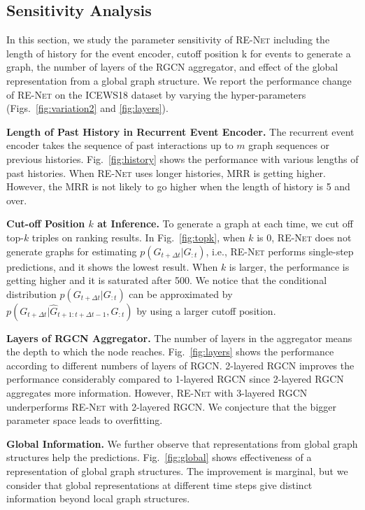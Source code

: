\documentclass[11pt,a4paper]{article}
\newcommand{\prob}{p}
\newcommand{\method}{\textsc{RE-Net}\xspace}
\newcommand{\para}[1]{\smallskip\noindent\textbf{#1}}
\begin{document}
\subsection{Sensitivity Analysis}
\label{sec:sens}
In this section, we study the parameter sensitivity of \method including the length of history for the event encoder, cutoff position k for events to generate a graph, the number of layers of the RGCN aggregator, and effect of the global representation from a global graph structure.
We report the performance change of \method on the ICEWS18 dataset by varying the hyper-parameters (Figs.~\ref{fig:variation2} and \ref{fig:layers}).


\para{Length of Past History in Recurrent Event Encoder.}
The recurrent event encoder takes the sequence of past interactions up to $m$ graph sequences or previous histories. 
Fig.~\ref{fig:history} shows the performance with various lengths of past histories.
When \method uses longer histories, MRR is getting higher.
However, the MRR is not likely to go higher when the length of history is 5 and over.

\para{Cut-off Position $k$ at Inference.} 
To generate a graph at each time, we cut off top-$k$ triples on ranking results.
In Fig.~\ref{fig:topk},
when $k$ is 0, \method does not generate graphs for estimating $\prob(G_{t+\Delta t}|G_{:t})$, i.e., \method performs single-step predictions, and it shows the lowest result.
When $k$ is larger, the performance is getting higher and it is saturated after 500.
We notice that the conditional distribution $\prob(G_{t+\Delta t}|G_{:t})$ can be approximated by $\prob(G_{t+\Delta t}|\allowbreak \hat{G}_{t+1:t+\Delta t -1},G_{:t})$ by using a larger cutoff position.


\para{Layers of RGCN Aggregator.}
The number of layers in the aggregator means the depth to which the node reaches.
Fig.~\ref{fig:layers} shows the performance according to different numbers of layers of RGCN.
2-layered RGCN improves the performance considerably compared to 1-layered RGCN since 2-layered RGCN aggregates more information.
However, \method with 3-layered RGCN underperforms \method with 2-layered RGCN. 
We conjecture that the bigger parameter space leads to overfitting.


\para{Global Information.}
We further observe that representations from global graph structures help the predictions. Fig.~\ref{fig:global} shows effectiveness of a representation of global graph structures. 
The improvement is marginal, but we consider that global representations at different time steps give distinct information beyond local graph structures.
\end{document}
